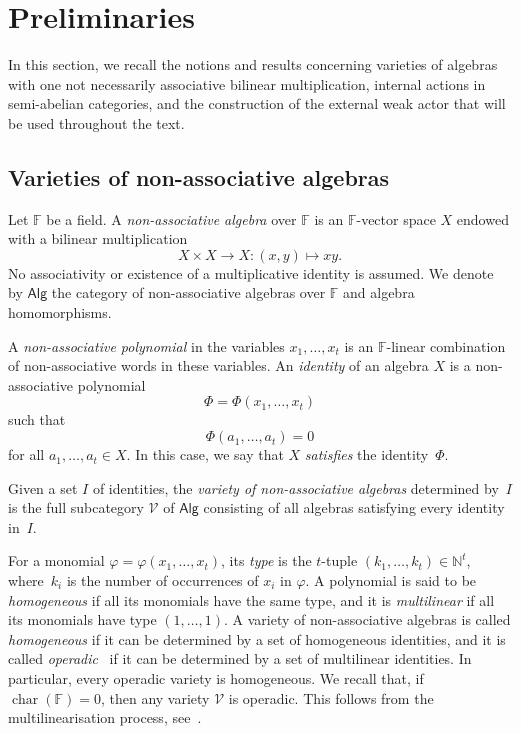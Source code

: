 \documentclass[reqno,a4paper]{amsart}
\theoremstyle{plain}
\theoremstyle{definition}
\theoremstyle{remark}
\numberwithin{equation}{section}
\newcommand{\F}{\mathbb{F}}
\newcommand{\V}{\mathcal{V}}
\DeclareMathOperator{\bchar}{char}
\newcommand{\Alg}{\ensuremath{\mathsf{Alg}}}
\begin{document}
\section{Preliminaries}\label{SecPreliminaries}

In this section, we recall the notions and results concerning varieties of algebras with one not necessarily associative bilinear multiplication, internal actions in semi-abelian categories, and the construction of the external weak actor that will be used throughout the text.

\subsection{Varieties of non-associative algebras}\label{SecVarieties}

Let $\F$ be a field. A \emph{non-associative algebra} over $\F$ is an $\F$-vector space $X$ endowed with a bilinear multiplication
\[
X\times X\to X\colon(x,y)\mapsto xy.
\]
No associativity or existence of a multiplicative identity is assumed. We denote by $\Alg$ the category of non-associative algebras over $\F$ and algebra homomorphisms.

A \emph{non-associative polynomial} in the variables $x_1,\ldots,x_t$ is an $\F$-linear combination of non-associative words in these variables. An \emph{identity} of an algebra $X$ is a non-associative polynomial
\[
\Phi=\Phi(x_1,\ldots,x_t)
\]
such that
\[
\Phi(a_1,\ldots,a_t)=0
\]
for all $a_1,\ldots,a_t\in X$. In this case, we say that $X$ \emph{satisfies} the identity~$\Phi$.

Given a set $I$ of identities, the \emph{variety of non-associative algebras} determined by~$I$ is the full subcategory $\V$ of $\Alg$ consisting of all algebras satisfying every identity in~$I$. 

For a monomial $\varphi=\varphi(x_1,\ldots,x_t)$, its \emph{type} is the $t$-tuple $(k_1,\ldots,k_t)\in\mathbb{N}^t$, where~$k_i$ is the number of occurrences of $x_i$ in $\varphi$. A polynomial is said to be \emph{homogeneous} if all its monomials have the same type, and it is \emph{multilinear} if all its monomials have type $(1,\ldots,1)$. A variety of non-associative algebras is called \emph{homogeneous} if it can be determined by a set of homogeneous identities, and it is called \emph{operadic}~\cite{Cosmash} if it can be determined by a set of multilinear identities. In particular, every operadic variety is homogeneous. We recall that, if $\bchar(\F)=0$, then any variety $\V$ is operadic. This follows from the multilinearisation process, see~\cite[Corollary 3.7]{Osborn}.
\end{document}
